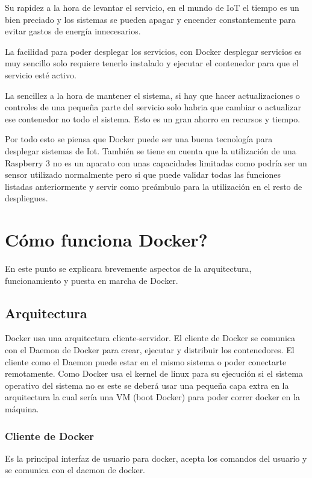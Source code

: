Su rapidez a la hora de levantar el servicio, en el mundo de IoT el tiempo es un bien preciado y los sistemas se pueden apagar y encender constantemente para evitar gastos de energía innecesarios.

La facilidad para poder desplegar los servicios, con Docker desplegar servicios es muy sencillo solo requiere tenerlo instalado y ejecutar el contenedor para que el servicio esté activo.

La sencillez a la hora de mantener el sistema, si hay que hacer actualizaciones o controles de una pequeña parte del servicio solo habria que cambiar o actualizar ese contenedor no todo el sistema. Esto es un gran ahorro en recursos y tiempo. 

Por todo esto se piensa que Docker puede ser una buena tecnología para desplegar sistemas de Iot. También se tiene en cuenta que la utilización de una Raspberry 3 no es un aparato con unas capacidades limitadas como podría ser un sensor utilizado normalmente pero si que puede validar todas las funciones listadas anteriormente y servir como preámbulo para la utilización en el resto de despliegues.  

\section{Cómo funciona Docker?}

En este punto se explicara brevemente aspectos de la arquitectura, funcionamiento y puesta en marcha de Docker.  

\subsection{Arquitectura}

Docker usa una arquitectura cliente-servidor. El cliente de Docker se comunica con el Daemon de Docker para crear, ejecutar y distribuir los contenedores. El cliente como el Daemon puede estar en el mismo sistema o poder conectarte remotamente.
Como Docker usa el kernel de linux para su ejecución si el sistema operativo del sistema no es este se deberá usar una pequeña capa extra en la arquitectura la cual sería una VM (boot Docker) para poder correr docker en la máquina. 

\subsubsection{Cliente de Docker}

Es la principal interfaz de usuario para docker, acepta los comandos del usuario y se comunica con el daemon de docker.


